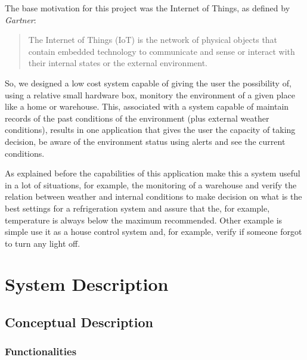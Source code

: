 \documentclass[12pt]{report}
\begin{document}
The base motivation for this project was the Internet of Things, as defined by \textit{Gartner}:

\blockquote{The Internet of Things (IoT) is the network of physical objects that contain embedded technology to communicate and sense or interact with their internal states or the external environment.}

So, we designed a low cost system capable of giving the user the possibility of, using a relative small hardware box, monitory the environment of a given place like a home or warehouse. This, associated with a system capable of maintain records of the past conditions of the environment (plus external weather conditions), results in one application that gives the user the capacity of taking decision, be aware of the environment status using alerts and see the current conditions.

As explained before the capabilities of this application make this a system useful in a lot of situations, for example, the monitoring of a warehouse and verify the relation between weather and internal conditions to make decision on what is the best settings for a refrigeration system and assure that the, for example, temperature is always below the maximum recommended. Other example is simple use it as a house control system and, for example, verify if someone forgot to turn any light off.

\newpage
\chapter{System Description}
\section{Conceptual Description}
\subsection{Functionalities}
\end{document}
